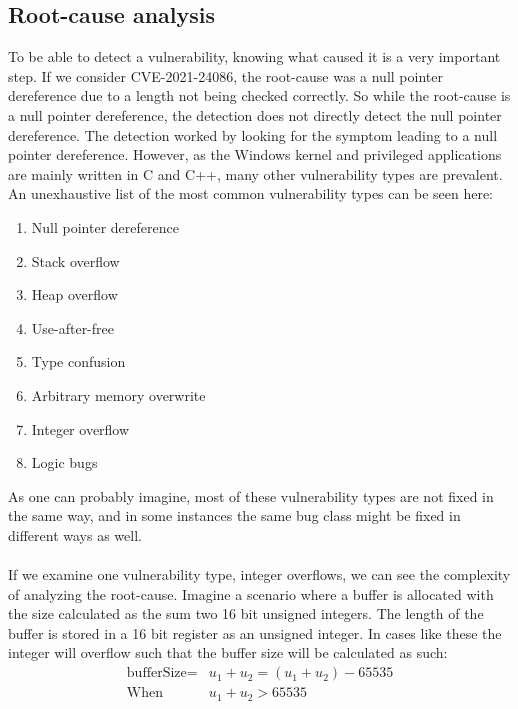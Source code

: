 \documentclass{report}
\begin{document}
\subsection{Root-cause analysis}
To be able to detect a vulnerability, knowing what caused it is a very important step. If we consider CVE-2021-24086, the root-cause was a null pointer dereference due to a length not being checked correctly. So while the root-cause is a null pointer dereference, the detection does not directly detect the null pointer dereference. The detection worked by looking for the symptom leading to a null pointer dereference. However, as the Windows kernel and privileged applications are mainly written in C and C++, many other vulnerability types are prevalent. An unexhaustive list of the most common vulnerability types can be seen here:

\begin{enumerate}
    \item Null pointer dereference
    \item Stack overflow
    \item Heap overflow
    \item Use-after-free
    \item Type confusion
    \item Arbitrary memory overwrite
    \item Integer overflow
    \item Logic bugs
\end{enumerate}

As one can probably imagine, most of these vulnerability types are not fixed in the same way, and in some instances the same bug class might be fixed in different ways as well.
\\
\\
If we examine one vulnerability type, integer overflows, we can see the complexity of analyzing the root-cause. Imagine a scenario where a buffer is allocated with the size calculated as the sum two 16 bit unsigned integers. The length of the buffer is stored in a 16 bit register as an unsigned integer. In cases like these the integer will overflow such that the buffer size will be calculated as such:
\begin{align}
    \text{bufferSize} = &u_1 + u_2 = (u_1 + u_2) - 65535 \\
    \text{When }&u_1 + u_2 > 65535 \nonumber
\end{align}
\end{document}
